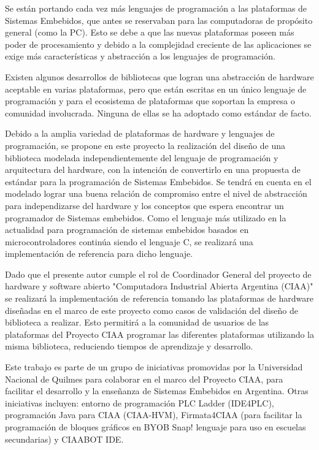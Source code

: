 Se están portando cada vez más lenguajes de programación a las plataformas de Sistemas Embebidos, que antes se reservaban para las computadoras de propósito general (como la PC).
Esto se debe a que las nuevas plataformas poseen más poder de procesamiento y debido a la complejidad creciente de las aplicaciones se exige más características y abstracción a los lenguajes de programación.

Existen algunos desarrollos de bibliotecas que logran una abstracción de hardware aceptable en varias plataformas, pero que están escritas en un único lenguaje de programación y para el ecosistema de plataformas que soportan la empresa o comunidad involucrada. Ninguna de ellas se ha adoptado como estándar de facto.





Debido a la amplia variedad de plataformas de hardware y lenguajes de programación, se propone en este proyecto la realización del diseño de una biblioteca modelada independientemente del lenguaje de programación y arquitectura del hardware, con la intención de convertirlo en una propuesta de estándar para la programación de Sistemas Embebidos. Se tendrá en cuenta en el modelado lograr una buena relación de compromiso entre el nivel de abstracción para independizarse del hardware y los conceptos que espera encontrar un programador de Sistemas embebidos.
Como el lenguaje más utilizado en la actualidad para programación de sistemas embebidos basados en microcontroladores continúa siendo el lenguaje C, se realizará una implementación de referencia para dicho lenguaje.

Dado que el presente autor cumple el rol de Coordinador General del proyecto de hardware y software abierto "Computadora Industrial Abierta Argentina (CIAA)" se realizará la implementación de referencia tomando las plataformas de hardware diseñadas en el marco de este proyecto como casos de validación del diseño de biblioteca a realizar. Esto permitirá a la comunidad de usuarios de las plataformas del Proyecto CIAA programar las diferentes plataformas utilizando la misma biblioteca, reduciendo tiempos de aprendizaje y desarrollo.

Este trabajo es parte de un grupo de iniciativas promovidas por la Universidad Nacional de Quilmes para colaborar en el marco del Proyecto CIAA, para facilitar el desarrollo y la enseñanza de Sistemas Embebidos en Argentina. Otras iniciativas incluyen: entorno de programación PLC Ladder (IDE4PLC), programación Java para CIAA (CIAA-HVM), Firmata4CIAA (para facilitar la programación de bloques gráficos en BYOB Snap! lenguaje para uso en escuelas secundarias) y CIAABOT IDE.

